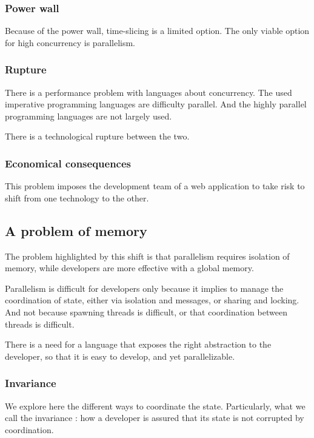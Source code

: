 \subsubsection{Power wall}

Because of the power wall, time-slicing is a limited option.
The only viable option for high concurrency is parallelism.

\subsubsection{Rupture}

There is a performance problem with languages about concurrency.
The used imperative programming languages are difficulty parallel.
And the highly parallel programming languages are not largely used.

There is a technological rupture between the two.

\subsubsection{Economical consequences}

This problem imposes the development team of a web application to take risk to shift from one technology to the other.


\subsection{A problem of memory}

The problem highlighted by this shift is that parallelism requires isolation of memory, while developers are more effective with a global memory.

Parallelism is difficult for developers only because it implies to manage the coordination of state, either via isolation and messages, or sharing and locking.
And not because spawning threads is difficult, or that coordination between threads is difficult.

There is a need for a language that exposes the right abstraction to the developer, so that it is easy to develop, and yet parallelizable.

\subsubsection{Invariance}

We explore here the different ways to coordinate the state.
Particularly, what we call the invariance : how a developer is assured that its state is not corrupted by coordination.

